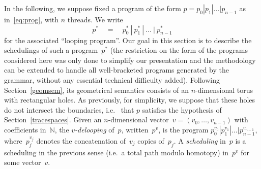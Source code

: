 \documentclass[orivec]{llncs} \usepackage[T1]{fontenc}
\newcommand{\N}{\mathbb{N}}
\newcommand{\nbd}{\nobreakdash-\hspace{0pt}}
\newcommand{\ie}{i.e.~}
\newcommand{\qeq}{\quad=\quad}
\begin{document}
In the following, we suppose fixed a program of the form
$p=p_0|p_1|\ldots|p_{n-1}$ as in~\eqref{eq:prog}, with $n$ threads. We write
\[
p^*\qeq p_0^*\ |\ p_1^*\ |\ \ldots\ |\ p_{n-1}^*
\]
for the associated ``looping program''. Our goal in this section is to describe
the schedulings of such a program~$p^*$ (the restriction on the form of the
programs considered here was only done to simplify our presentation and the
methodology can be extended to handle all well-bracketed programs generated by
the grammar, without any essential technical difficulty added). Following
Section~\ref{geomsem}, its geometrical semantics consists of an
$n$\nbd{}dimensional torus with rectangular holes. As previously, for
simplicity, we suppose that these holes do not intersect the boundaries, \ie
that $p$ satisfies the hypothesis of Section~\ref{tracespaces}. Given an
$n$-dimensional vector~$v=(v_0,\ldots,v_{n-1})$ with coefficients in~$\N$, the
\emph{$v$-delooping} of~$p$, written~$p^v$, is the program
$p_0^{v_0}|p_1^{v_1}|\ldots|p_{n-1}^{v_{n-1}}$, where~$p_j^{v_j}$ denotes the
concatenation of~$v_j$ copies of~$p_j$. A \emph{scheduling} in~$p$ is a
scheduling in the previous sense (\ie a total path modulo homotopy) in~$p^v$ for
some vector~$v$.
\end{document}
